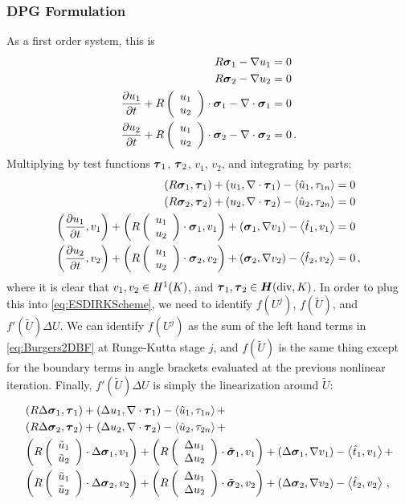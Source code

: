 \documentclass[Proposal.tex]{subfiles}
\begin{document}
\subsubsection{DPG Formulation}
As a first order system, this is
\begin{equation}
	\begin{aligned}
		R\boldsymbol\sigma_1-\nabla u_1&=0\\
		R\boldsymbol\sigma_2-\nabla u_2&=0\\
		\frac{\partial u_1}{\partial t}+R\left( \begin{array}{c} u_1\\ u_2\\ \end{array} \right)\cdot\boldsymbol\sigma_1-\nabla\cdot\boldsymbol\sigma_1&=0\\
		\frac{\partial u_2}{\partial t}+R\left( \begin{array}{c} u_1\\ u_2\\ \end{array} \right)\cdot\boldsymbol\sigma_2-\nabla\cdot\boldsymbol\sigma_2&=0\,.
	\end{aligned}
\end{equation}
Multiplying by test functions $\boldsymbol\tau_1$, $\boldsymbol\tau_2$, $v_1$, $v_2$, and integrating by parts:
\begin{equation}
\label{eq:Burgers2DBF}
	\begin{aligned}
		\left( R\boldsymbol\sigma_1,\boldsymbol\tau_1 \right)+\left( u_1,\nabla\cdot\boldsymbol\tau_1 \right)-\left\langle \hat u_1,\tau_{1n} \right\rangle&=0\\
		\left( R\boldsymbol\sigma_2,\boldsymbol\tau_2 \right)+\left( u_2,\nabla\cdot\boldsymbol\tau_2 \right)-\left\langle \hat u_2,\tau_{2n} \right\rangle&=0\\
		\left( \frac{\partial u_1}{\partial t},v_1 \right)+\left( R\left( \begin{array}{c} u_1\\ u_2\\ \end{array} \right)\cdot\boldsymbol\sigma_1,v_1 \right)+\left( \boldsymbol\sigma_1,\nabla v_1 \right)-\left\langle \hat t_1,v_1 \right\rangle&=0\\
		\left( \frac{\partial u_2}{\partial t},v_2 \right)+\left( R\left( \begin{array}{c} u_1\\ u_2\\ \end{array} \right)\cdot\boldsymbol\sigma_2,v_2 \right)+\left( \boldsymbol\sigma_2,\nabla v_2 \right)-\left\langle \hat t_2,v_2 \right\rangle&=0\,,
	\end{aligned}
\end{equation}
where it is clear that $v_1,v_2\in H^{1}(K)$, and $\boldsymbol\tau_1,\boldsymbol\tau_2\in\mbox{\boldmath $H$}(\text{div},K)$. 
In order to plug this into \eqref{eq:ESDIRKScheme}, we need to identify $f(U^j)$, $f(\tilde U)$, and $f'(\tilde U)\Delta U$.
We can identify $f(U^j)$ as the sum of the left hand terms in \eqref{eq:Burgers2DBF} at Runge-Kutta stage $j$, 
and $f(\tilde U)$ is the same thing except for the boundary terms in angle brackets evaluated at the previous nonlinear iteration.
Finally, $f'(\tilde U)\Delta U$ is simply the linearization around $\tilde U$:
\begin{equation}
\label{eq:Burgers2DJacobian}
	\begin{aligned}
		&\left( R\Delta\boldsymbol\sigma_1,\boldsymbol\tau_1 \right)+\left( \Delta u_1,\nabla\cdot\boldsymbol\tau_1 \right)-\left\langle \hat u_1,\tau_{1n} \right\rangle+\\
		&\left( R\Delta\boldsymbol\sigma_2,\boldsymbol\tau_2 \right)+\left( \Delta u_2,\nabla\cdot\boldsymbol\tau_2 \right)-\left\langle \hat u_2,\tau_{2n} \right\rangle+\\
		&\left( R\left( \begin{array}{c} \tilde u_1\\ \tilde u_2\\ \end{array} \right)\cdot\Delta\boldsymbol\sigma_1,v_1 \right)+\left( R\left( \begin{array}{c} \Delta u_1\\ \Delta u_2\\ \end{array} \right)\cdot\tilde{\boldsymbol\sigma}_1,v_1 \right)+\left( \Delta\boldsymbol\sigma_1,\nabla v_1 \right)-\left\langle \hat t_1,v_1 \right\rangle+\\
		&\left( R\left( \begin{array}{c} \tilde u_1\\ \tilde u_2\\ \end{array} \right)\cdot\Delta\boldsymbol\sigma_2,v_2 \right)+\left( R\left( \begin{array}{c} \Delta u_1\\ \Delta u_2\\ \end{array} \right)\cdot\tilde{\boldsymbol\sigma}_2,v_2 \right)+\left( \Delta\boldsymbol\sigma_2,\nabla v_2 \right)-\left\langle \hat t_2,v_2 \right\rangle\,,
	\end{aligned}
\end{equation}
\end{document}
